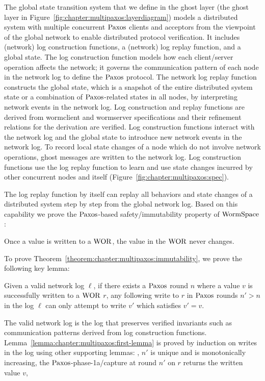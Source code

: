 The global state transition system that we define in the ghost layer (the ghost layer in Figure~\ref{fig:chapter:multipaxos:layerdiagram}) 
models a distributed system with multiple concurrent $\mathrm{Paxos}$ clients and acceptors from the viewpoint of the global network to enable  distributed protocol verification. 
It includes (network) log construction functions, a (network) log replay function, and a global state.
The log construction function models how each client/server operation affects the network; 
it governs the communication pattern of each node in the network log to define the $\mathrm{Paxos}$ protocol. 
The network log replay function constructs the global state, 
which is a snapshot of the entire distributed system state or a combination of $\mathrm{Paxos}$-related states in all nodes,
 by interpreting network events in the network log. Log construction and replay functions are derived from wormclient and wormserver specifications and their refinement relations for the derivation are verified. 
Log construction functions interact with the network log and the global state to introduce new network events in the network log. 
To record local state changes of a node which do not involve network operations, ghost messages are written 
to the network log. 
Log construction functions use the log replay function to learn and use state changes incurred by other concurrent nodes and itself (Figure~\ref{fig:chapter:multipaxos:spec}).


The log replay function by itself can replay all behaviors and state changes of a distributed system step by step from the global network log. Based on this capability we prove the $\mathrm{Paxos}$-based safety/immutability property of $\mathrm{WormSpace}$:
\begin{theorem}[Immutability]
\label{theorem:chapter:multipaxos:immutability}
 Once a value is written to a $\mathrm{WOR}$, the value in the $\mathrm{WOR}$ never changes.
 \end{theorem}
To prove Theorem~\ref{theorem:chapter:multipaxos:immutability}, we prove the following key lemma: 
\begin{lemma}
\label{lemma:chapter:multipaxos:first-lemma}
 Given a valid network log $\ell$, if there exists a $\mathrm{Paxos}$ round $n$ where a value $v$ is successfully written to a $\mathrm{WOR}$ $r$, any following write to $r$ in $\mathrm{Paxos}$ rounds $n' > n$ in the log $\ell$
can only attempt to write $v'$ which satisfies $v' = v$.
\end{lemma}
The valid network log is the log that preserves verified invariants such as communication patterns derived from log construction functions.
Lemma~\ref{lemma:chapter:multipaxos:first-lemma} is proved by induction on writes in the log using other supporting lemmas: \eg, $n'$ is unique and is monotonically increasing, the $\mathrm{Paxos}$-phase-1a/capture at round $n'$ on $r$ returns the written value $v$, \etc

